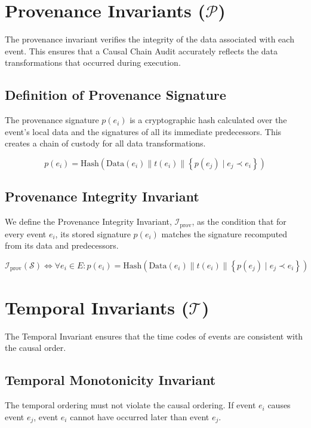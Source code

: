 \documentclass{article}
\begin{document}
\section{Provenance Invariants ($\mathcal{P}$)}
The provenance invariant verifies the integrity of the data associated with each event. This ensures that a Causal Chain Audit accurately reflects the data transformations that occurred during execution.

\subsection{Definition of Provenance Signature}
The provenance signature $p(e_i)$ is a cryptographic hash calculated over the event's local data and the signatures of all its immediate predecessors. This creates a chain of custody for all data transformations.

\begin{equation}
\label{eq:provenance_signature}
p(e_i) = \text{Hash}(\text{Data}(e_i) \| t(e_i) \| \left\{ p(e_j) \mid e_j \prec e_i \right\})
\end{equation}

\subsection{Provenance Integrity Invariant}
We define the Provenance Integrity Invariant, $\mathcal{I}_{\text{prov}}$, as the condition that for every event $e_i$, its stored signature $p(e_i)$ matches the signature recomputed from its data and predecessors.

\begin{equation}
\label{eq:provenance_invariant}
\mathcal{I}_{\text{prov}}(\mathcal{S}) \iff \forall e_i \in E: p(e_i) = \text{Hash}(\text{Data}(e_i) \| t(e_i) \| \left\{ p(e_j) \mid e_j \prec e_i \right\})
\end{equation}

\section{Temporal Invariants ($\mathcal{T}$)}
The Temporal Invariant ensures that the time codes of events are consistent with the causal order.

\subsection{Temporal Monotonicity Invariant}
The temporal ordering must not violate the causal ordering. If event $e_i$ causes event $e_j$, event $e_i$ cannot have occurred later than event $e_j$.
\end{document}
